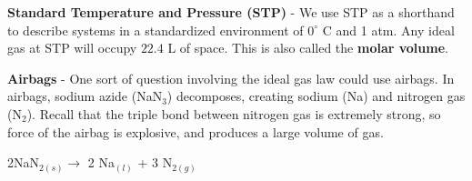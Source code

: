 \documentclass{article}
\begin{document}
\noindent \textbf{Standard Temperature and Pressure (STP)} - We use STP as a shorthand to describe systems in a standardized environment of $0^{\circ}$ C and 1 atm. Any ideal gas at STP will occupy $22.4$ L of space. This is also called the \textbf{molar volume}.\\
\pagebreak

\noindent\textbf{Airbags} - One sort of question involving the ideal gas law could use airbags. In airbags, sodium azide (NaN$_3$) decomposes, creating sodium (Na) and nitrogen gas (N$_2$). Recall that the triple bond between nitrogen gas is extremely strong, so force of the airbag is explosive, and produces a large volume of gas.\\
\vspace{-10pt}
\begin{center}
	2NaN$_{2(s)} \longrightarrow$ 2 Na$_(l)$ + 3 N$_{2(g)}$
\end{center}
\end{document}
